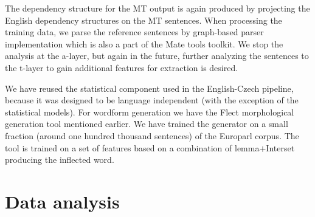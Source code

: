 The dependency structure for the MT output is again produced by projecting the English dependency
structures on the MT sentences. When processing the training data, we parse the reference sentences
by graph-based parser\cite{Bohnet:2010:VHA:1873781.1873792} implementation which is also a part of the
Mate tools toolkit. We stop the analysis at the a-layer, but again in the future, further analyzing
the sentences to the t-layer to gain additional features for extraction is desired.

We have reused the statistical component used in the English-Czech pipeline, because it was designed to be
language independent (with the exception of the statistical models). For wordform generation we have
the Flect morphological generation tool mentioned earlier. We have trained the generator on a small
fraction (around one hundred thousand sentences) of the Europarl corpus. The tool is trained on a set
of features based on a combination of lemma$+$Interset producing the inflected word.

\section{Data analysis}
